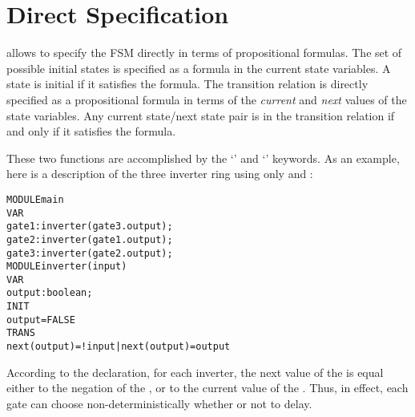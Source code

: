 \section{Direct Specification}
\label{Direct Specification}

\nusmv allows to specify the FSM directly in terms of
propositional formulas. The set of possible initial states is specified
as a formula in the current state variables. A state is initial if it
satisfies the formula. The transition relation is directly specified as
a propositional formula in terms of the \emph{current} and \emph{next}
values of the state variables. Any current state/next state pair is in
the transition relation if and only if it satisfies the formula.

These two functions are accomplished by the `' and `'
keywords. As an example, here is a description of the three inverter
ring using only  and :\\
\begin{alltt}
MODULE main
 VAR
   gate1 : inverter(gate3.output);
   gate2 : inverter(gate1.output);
   gate3 : inverter(gate2.output);
MODULE inverter(input)
 VAR
   output : boolean;
 INIT
   output = FALSE
 TRANS
   next(output) = !input | next(output) = output
\end{alltt}

According to the  declaration, for each inverter,
the next value of the  is equal either to the negation of
the , or to the current value of the . Thus, in
effect, each gate can choose non-deterministically whether or not to
delay.


